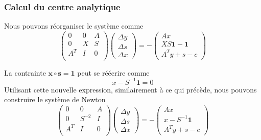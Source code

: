 \documentclass[usepdftitle=false, aspectratio=169]{beamer}
\def\bs{\boldsymbol{s}}
\def\bx{\boldsymbol{x}}
\def\bone{\boldsymbol{1}}
\begin{document}
\begin{frame}
\frametitle{Calcul du centre analytique}

Nous pouvons réorganiser le système comme
$$
\begin{pmatrix}
	0 & 0 & A \\
	0 & X & S \\
	A^T & I & 0 \\
\end{pmatrix}
\begin{pmatrix}
	\Delta y \\ \Delta s \\ \Delta x
\end{pmatrix}
=
-
\begin{pmatrix}
	Ax \\ XS\bone - \bone \\ A^Ty+s-c
\end{pmatrix}
$$

\mbox {}

La contrainte $\bx \circ \bs = \bone$ peut se réécrire comme
$$
x-S^{-1}\bone = 0
$$
Utilisant cette nouvelle expression, similairement à ce qui précède, nous pouvons construire le système de Newton
$$
\begin{pmatrix}
	0 & 0 & A \\
	0 & S^{-2} & I \\
	A^T & I & 0 \\
\end{pmatrix}
\begin{pmatrix}
	\Delta y \\ \Delta s \\ \Delta x
\end{pmatrix}
=
-
\begin{pmatrix}
	Ax \\ x-S^{-1}\bone \\ A^Ty+s-c
\end{pmatrix}
$$

\end{frame}
\end{document}
